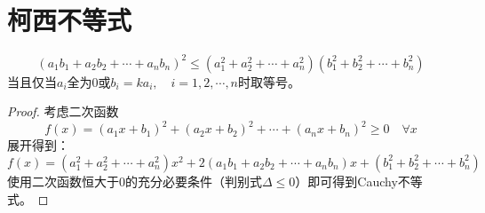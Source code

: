 \section{柯西不等式}

\begin{theorem}[Cauchy不等式]\label{cauchy_ieq}
    $$
        (a_1b_1+a_2b_2+\cdots+a_nb_n)^2\leq (a_1^2+a_2^2+\cdots+a_n^2)(b_1^2+b_2^2+\cdots+b_n^2)
    $$
    当且仅当$a_i$全为0或$b_i=ka_i, \quad i=1,2,\cdots,n$时取等号。
\end{theorem}
\begin{proof}
    考虑二次函数
    $$
        f(x) = (a_1x+b_1)^2+(a_2x+b_2)^2+\cdots+(a_nx+b_n)^2 \ge 0 \quad \forall x
    $$
    展开得到：
    $$
        f(x) = (a_1^2+a_2^2+\cdots+a_n^2)x^2 + 2(a_1b_1+a_2b_2+\cdots+a_nb_n)x + (b_1^2+b_2^2+\cdots+b_n^2)
    $$
    使用二次函数恒大于0的充分必要条件（判别式$\Delta \le 0$）即可得到Cauchy不等式。
\end{proof}